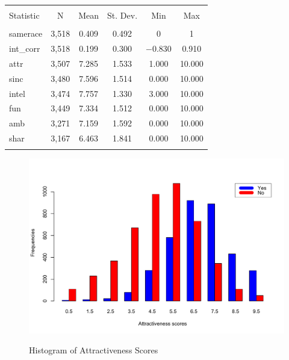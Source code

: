 \documentclass{article}
\begin{document}
\null\\
\begin{table}[!htbp] \centering 
  \caption{} 
  \label{} 
\begin{tabular}{@{\extracolsep{5pt}}lccccc} 
\\[-1.8ex]\hline 
\hline \\[-1.8ex] 
Statistic & \multicolumn{1}{c}{N} & \multicolumn{1}{c}{Mean} & \multicolumn{1}{c}{St. Dev.} & \multicolumn{1}{c}{Min} & \multicolumn{1}{c}{Max} \\ 
\hline \\[-1.8ex] 
samerace & 3,518 & 0.409 & 0.492 & 0 & 1 \\ 
int\_corr & 3,518 & 0.199 & 0.300 & $-$0.830 & 0.910 \\ 
attr & 3,507 & 7.285 & 1.533 & 1.000 & 10.000 \\ 
sinc & 3,480 & 7.596 & 1.514 & 0.000 & 10.000 \\ 
intel & 3,474 & 7.757 & 1.330 & 3.000 & 10.000 \\ 
fun & 3,449 & 7.334 & 1.512 & 0.000 & 10.000 \\ 
amb & 3,271 & 7.159 & 1.592 & 0.000 & 10.000 \\ 
shar & 3,167 & 6.463 & 1.841 & 0.000 & 10.000 \\ 
\hline \\[-1.8ex] 
\end{tabular} 
\end{table} 
%
\begin{figure}[H]
	\caption{Histogram of Attractiveness Scores}
	\includegraphics[scale=0.60]{AttractivenessScores}
	\centering
	\label{fig:attractiveness}
\end{figure}
\end{document}
